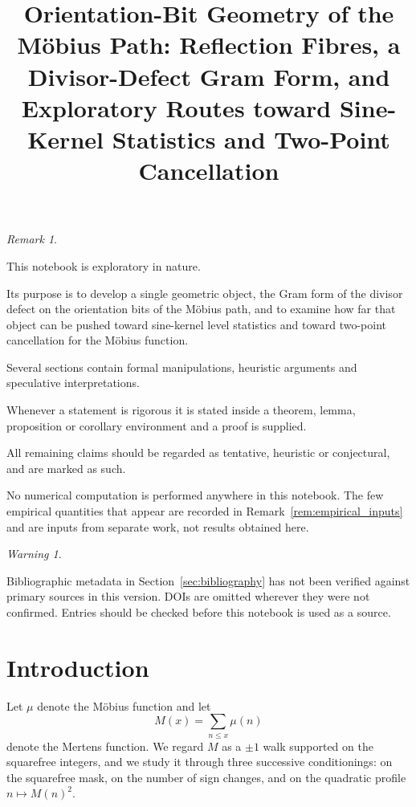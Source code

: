 \documentclass[11pt]{amsart}
\title{
Orientation-Bit Geometry of the M\"obius Path:
Reflection Fibres, a Divisor-Defect Gram Form,
and Exploratory Routes toward Sine-Kernel Statistics
and Two-Point Cancellation
}
\author{}
\date{}
\numberwithin{equation}{section}
\theoremstyle{plain}
\theoremstyle{definition}
\theoremstyle{remark}
\newtheorem{remark}[theorem]{Remark}
\newtheorem{warning}[theorem]{Warning}
\begin{document}
\maketitle

\tableofcontents

\bigskip

\begin{remark}
\label{rem:exploratory_nature}

This notebook is exploratory in nature.

Its purpose is to develop a single geometric object, the Gram form of
the divisor defect on the orientation bits of the M\"obius path, and to
examine how far that object can be pushed toward sine-kernel level
statistics and toward two-point cancellation for the M\"obius function.

Several sections contain formal manipulations, heuristic arguments and
speculative interpretations.

Whenever a statement is rigorous it is stated inside a theorem, lemma,
proposition or corollary environment and a proof is supplied.

All remaining claims should be regarded as tentative, heuristic or
conjectural, and are marked as such.

No numerical computation is performed anywhere in this notebook. The
few empirical quantities that appear are recorded in
Remark~\ref{rem:empirical_inputs} and are inputs from separate work,
not results obtained here.

\end{remark}

\begin{warning}
\label{warn:bibliographic_metadata}

Bibliographic metadata in Section~\ref{sec:bibliography} has not been
verified against primary sources in this version. DOIs are omitted
wherever they were not confirmed. Entries should be checked before this
notebook is used as a source.

\end{warning}

\section{Introduction}
\label{sec:introduction}

Let $\mu$ denote the M\"obius function and let
\begin{equation}
M(x) = \sum_{n \le x} \mu(n)
\label{eq:mertens_definition}
\end{equation}
denote the Mertens function. We regard $M$ as a $\pm 1$ walk supported
on the squarefree integers, and we study it through three successive
conditionings: on the squarefree mask, on the number of sign changes,
and on the quadratic profile $n \mapsto M(n)^2$.
\end{document}
